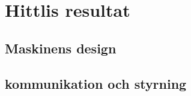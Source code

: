 \documentclass[11pt,a4paper,oneside]{book}
\begin{document}
\chapter{Hittlis resultat}
\section{Maskinens design}

%
\section{kommunikation och styrning}



\end{document}
